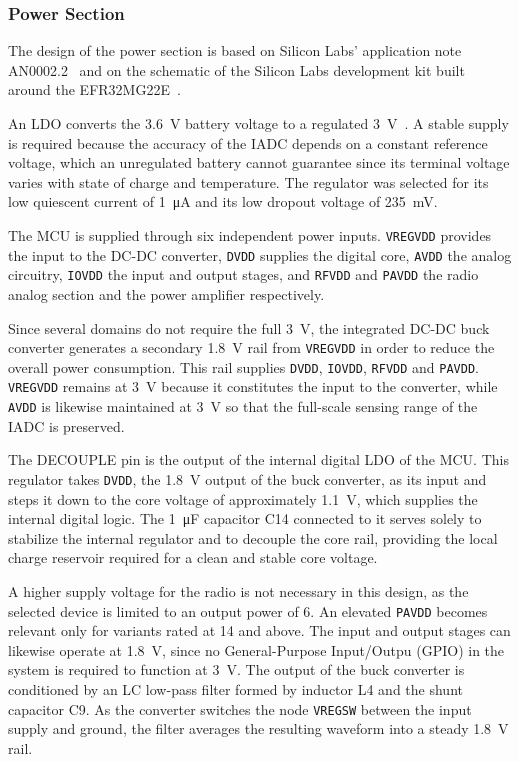 \subsubsection{Power Section} \label{sec:power}
The design of the power section is based on Silicon Labs' application note AN0002.2~\cite{Hardware_design_considerations} and on the schematic of the Silicon Labs development kit built around the EFR32MG22E~\cite{Dev_Kit_Schematic}.

An LDO converts the \SI{3.6}{\volt} battery voltage to a regulated \SI{3}{\volt}~\cite{LDO}. A stable supply is required because the accuracy of the IADC depends on a constant reference voltage, which an unregulated battery cannot guarantee since its terminal voltage varies with state of charge and temperature. The regulator was selected for its low quiescent current of \SI{1}{\micro\ampere} and its low dropout voltage of \SI{235}{\milli\volt}.
 
The MCU is supplied through six independent power inputs. \texttt{VREGVDD} provides the input to the DC-DC converter, \texttt{DVDD} supplies the digital core, \texttt{AVDD} the analog circuitry, \texttt{IOVDD} the input and output stages, and \texttt{RFVDD} and \texttt{PAVDD} the radio analog section and the power amplifier respectively.
 
Since several domains do not require the full \SI{3}{\volt}, the integrated DC-DC buck converter generates a secondary \SI{1.8}{\volt} rail from \texttt{VREGVDD} in order to reduce the overall power consumption. This rail supplies \texttt{DVDD}, \texttt{IOVDD}, \texttt{RFVDD} and \texttt{PAVDD}. \texttt{VREGVDD} remains at \SI{3}{\volt} because it constitutes the input to the converter, while \texttt{AVDD} is likewise maintained at \SI{3}{\volt} so that the full-scale sensing range of the IADC is preserved.

The DECOUPLE pin is the output of the internal digital LDO of the MCU. This regulator takes \texttt{DVDD}, the \SI{1.8}{\volt} output of the buck converter, as its input and steps it down to the core voltage of approximately \SI{1.1}{\volt}, which supplies the internal digital logic. The \SI{1}{\micro\farad} capacitor C14 connected to it serves solely to stabilize the internal regulator and to decouple the core rail, providing the local charge reservoir required for a clean and stable core voltage.
 
A higher supply voltage for the radio is not necessary in this design, as the selected device is limited to an output power of \SI{6}{\dBm}. An elevated \texttt{PAVDD} becomes relevant only for variants rated at \SI{14}{\dBm} and above. The input and output stages can likewise operate at \SI{1.8}{\volt}, since no General-Purpose Input/Outpu (GPIO) in the system is required to function at \SI{3}{\volt}. The output of the buck converter is conditioned by an LC low-pass filter formed by inductor L4 and the shunt capacitor C9. As the converter switches the node \texttt{VREGSW} between the input supply and ground, the filter averages the resulting waveform into a steady \SI{1.8}{\volt} rail.


